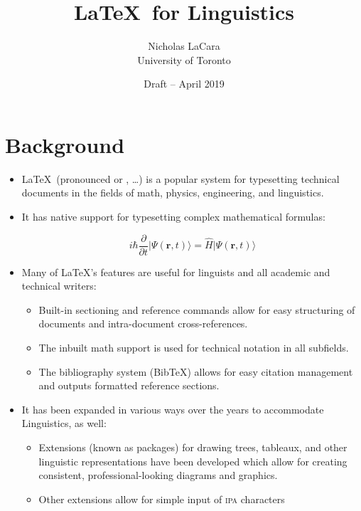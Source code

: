 \documentclass[11pt, letterpaper]{article}
\title{\LaTeX\ for Linguistics}
\author{Nicholas LaCara \\ University of Toronto}
\date{Draft -- April 2019}
\begin{document}
  
  \maketitle
  
  \tableofcontents
  
  \newpage
  
  \section{Background}
  
    \begin{itemize}
      \item \LaTeX\ (pronounced \textipa{["lA.tEx]} or \textipa{["lA.tEk]}, \ldots) is a popular system for typesetting technical documents in the fields of math, physics, engineering, and linguistics.
      
      \item It has native support for typesetting complex mathematical formulas:
      
	$$ i \hbar \frac{\partial}{\partial t}\vert\Psi(\mathbf{r},t)\rangle = \hat H\vert\Psi(\mathbf{r},t)\rangle $$
	
	\item Many of \LaTeX's features are useful for linguists and all academic and technical writers:
	
	  \begin{itemize}	    
	    \item Built-in sectioning and reference commands allow for easy structuring of documents and intra-document cross-references.
	    
	    \item The inbuilt math support is used for technical notation in all subfields.

	    \item The bibliography system (Bib\TeX) allows for easy citation management and outputs formatted reference sections.	    

	  \end{itemize}

      
      \item It has been expanded in various ways over the years to accommodate Linguistics, as well:
      
	  \begin{itemize}
	    
	    \item Extensions (known as packages) for drawing trees, tableaux, and other linguistic representations have been developed which allow for creating consistent, professional-looking diagrams and graphics.
	    
	    \item Other extensions allow for simple input of \textsc{ipa} characters
	  \end{itemize}
      
    \end{itemize}
    
\end{document}
